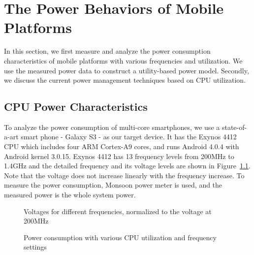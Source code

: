 \chapter{The Power Behaviors of Mobile Platforms}

In this section, we first measure and analyze the power consumption characteristics of mobile platforms with
various frequencies and utilization. We use the measured power data to construct a utility-based power model.
Secondly, we discuss the current power management techniques based on CPU utilization.

\section{CPU Power Characteristics}

To analyze the power consumption of multi-core smartphones, we use a state-of-a-art smart phone - Galaxy S3 - as our target device.
It has the Exynos 4412 CPU which includes four ARM Cortex-A9 cores, and runs Android 4.0.4 with Android kernel 3.0.15.
Exynos 4412 has 13 frequency levels from 200MHz to 1.4GHz and the detailed frequency and its voltage levels are shown in
Figure~\ref{fig:voltage}. Note that the voltage does not increase linearly with the frequency increase.
To measure the power consumption, Monsoon power meter is used, and the measured power is 
the whole system power.

\begin{figure}[bt]
\begin{center}
\vspace{-0.2in}
\end{center}
\caption{Voltages for different frequencies, normalized to the voltage at 200MHz}
\label{fig:voltage}
\end{figure}

\begin{figure}[bt]
\begin{center}
\vspace{-0.1in}
\end{center}
\caption{Power consumption with various CPU utilization and frequency settings}
\label{fig:util_power}
\end{figure}

